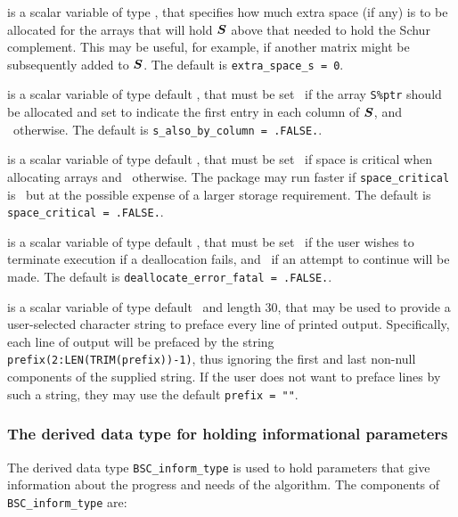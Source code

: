 \documentclass{galahad}
\newcommand{\packagename}{BSC}
\begin{document}
\begin{description}
 is a scalar variable of type \integer, 
that specifies how much extra space (if any) is to be allocated for the arrays 
that will hold ${\bm{S}}$ above that needed to hold the Schur complement.
This may be useful, for example, if another matrix might be subsequently added
to ${\bm{S}}$.
The default is {\tt extra\_space\_s = 0}.

 is a scalar variable of type default \logical, 
that must be set \true\ if the array {\tt S\%ptr} should be allocated and set 
to indicate the first entry in each column of ${\bm{S}}$, and  \false\ otherwise. 
The default is {\tt s\_also\_by\_column = .FALSE.}.

 is a scalar variable of type default \logical, 
that must be set \true\ if space is critical when allocating arrays
and  \false\ otherwise. The package may run faster if 
{\tt space\_critical} is \false\ but at the possible expense of a larger
storage requirement. The default is {\tt space\_critical = .FALSE.}.

 is a scalar variable of type default \logical, 
that must be set \true\ if the user wishes to terminate execution if
a deallocation  fails, and \false\ if an attempt to continue
will be made. The default is {\tt deallocate\_error\_fatal = .FALSE.}.

 is a scalar variable of type default \character\
and length 30, that may be used to provide a user-selected 
character string to preface every line of printed output. 
Specifically, each line of output will be prefaced by the string 
{\tt prefix(2:LEN(TRIM(prefix))-1)},
thus ignoring the first and last non-null components of the
supplied string. If the user does not want to preface lines by such
a string, they may use the default {\tt prefix = ""}.

\end{description}


\subsubsection{The derived data type for holding informational
 parameters}\label{typeinform}
The derived data type 
{\tt \packagename\_inform\_type} 
is used to hold parameters that give information about the progress and needs 
of the algorithm. The components of 
{\tt \packagename\_inform\_type} 
are:
\end{document}
